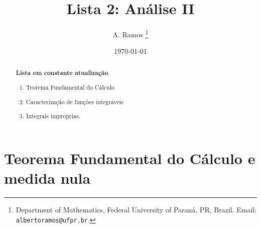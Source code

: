 \documentclass{article}
\theoremstyle{plain}
\theoremstyle{definition}
\theoremstyle{remark}
\begin{document}
\title{Lista 2: Análise II}

\author{
A. Ramos \thanks{Department of Mathematics,
    Federal University of Paraná, PR, Brazil.
    Email: {\tt albertoramos@ufpr.br}.}
}

\date{\today}
 
\maketitle

\begin{abstract}
{\bf Lista em constante atualização}.
\begin{enumerate}
	\item Teorema Fundamental do Cálculo 
	\item Caracterização de funções integráveis
	\item Integrais improprias.
\end{enumerate}
\end{abstract}


\section{Teorema Fundamental do Cálculo e medida nula  } 
\end{document}
